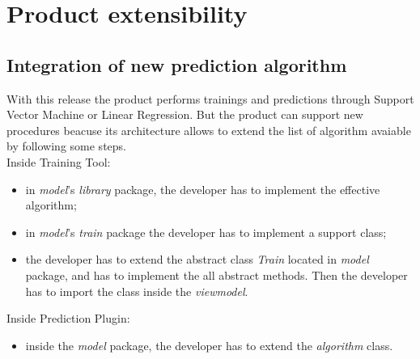\section{Product extensibility}
\subsection{Integration of new prediction algorithm}
With this release the product performs trainings and predictions through Support Vector Machine or Linear Regression. But the product can support new procedures beacuse its architecture allows to extend the list of algorithm avaiable by following some steps.\\
Inside Training Tool:
\begin{itemize}
\item in \textit{model}'s \textit{library} package, the developer has to implement the effective algorithm;
\item in \textit{model}'s \textit{train} package the developer has to implement a support class;
\item the developer has to extend the abstract class \textit{Train} located in \textit{model} package, and has to implement the all abstract methods. Then the developer has to import the class inside the \textit{viewmodel}.
\end{itemize}
Inside Prediction Plugin:
\begin{itemize}
\item inside the \textit{model} package, the developer has to extend the \textit{algorithm} class.
\end{itemize}
